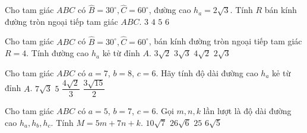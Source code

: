 \begin{vd}%
	Cho tam giác $ABC$ có $\widehat{B}={30^{\circ }},\widehat{C}={60^{\circ }}$, đường cao ${h_a}=2\sqrt{3}$. Tính $R$ bán kính đường tròn ngoại tiếp tam giác $ABC$. 
	\choice
	{$3$}
	{\True$4$}
	{$5$}
	{$6$}
\end{vd}

\begin{vd}%
	Cho tam giác $ABC$ có $\widehat{B}={{30}^{\circ }},\widehat{C}={{60}^{\circ }}$, bán kính đường tròn ngoại tiếp tam giác $R=4$. Tính đường cao $h_a$ kẻ từ đỉnh $A$.
	\choice
	{$3\sqrt{2}$}
	{$3\sqrt{3}$}
	{$4\sqrt{2}$}
	{\True$2\sqrt{3}$}
\end{vd}

\begin{vd}%
	Cho tam giác $ABC$ có $a=7$, $b=8$, $c=6$. Hãy tính độ dài đường cao $h_a$ kẻ từ đỉnh $A$.
	\choice
	{$7\sqrt{3}$}
	{$5$}
	{$\dfrac{4\sqrt{2}}{3}$}
	{\True$\dfrac{3\sqrt{15}}{2}$}
\end{vd}

\begin{vd}%
	Cho tam giác $ABC$ có $a=5$, $b=$7, $c=6$. Gọi $m,n,k$ lần lượt là độ dài đường cao $h_a,h_b,h_c$. Tính $M=5m+7n+k.$
	\choice
	{$10\sqrt{7}$}
	{\True$26\sqrt{6}$}
	{$25$}
	{$6\sqrt{5}$}
\end{vd}


